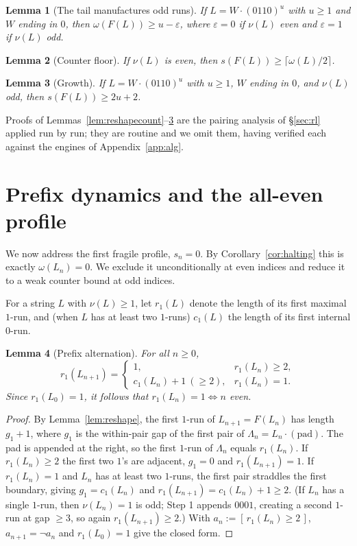 \documentclass[11pt,reqno]{amsart}
\theoremstyle{plain}
\newtheorem{lemma}{Lemma}
\theoremstyle{definition}
\theoremstyle{remark}
\begin{document}
\begin{lemma}[The tail manufactures odd runs]\label{lem:tailodd}
If $L=W\cdot(0110)^u$ with $u\ge 1$ and $W$ ending in $0$, then $\omega(F(L))\ge u-\varepsilon$, where $\varepsilon=0$ if $\nu(L)$ even and $\varepsilon=1$ if $\nu(L)$ odd.
\end{lemma}

\begin{lemma}[Counter floor]\label{lem:cfloor}
If $\nu(L)$ is even, then $s(F(L))\ge\lceil\omega(L)/2\rceil$.
\end{lemma}

\begin{lemma}[Growth]\label{lem:growth}
If $L=W\cdot(0110)^u$ with $u\ge 1$, $W$ ending in $0$, and $\nu(L)$ odd, then $s(F(L))\ge 2u+2$.
\end{lemma}

Proofs of Lemmas~\ref{lem:reshapecount}--\ref{lem:growth} are the pairing analysis of \S\ref{sec:rl} applied run by run; they are routine and we omit them, having verified each against the engines of Appendix~\ref{app:alg}.

\section{Prefix dynamics and the all-even profile}\label{sec:prefix}
We now address the first fragile profile, $s_n=0$. By Corollary~\ref{cor:halting} this is exactly $\omega(L_n)=0$. We exclude it unconditionally at even indices and reduce it to a weak counter bound at odd indices.

For a string $L$ with $\nu(L)\ge 1$, let $r_1(L)$ denote the length of its first maximal $1$-run, and (when $L$ has at least two $1$-runs) $c_1(L)$ the length of its first internal $0$-run.

\begin{lemma}[Prefix alternation]\label{lem:prefix}
For all $n\ge 0$,
\[ r_1(L_{n+1})=\begin{cases}1,& r_1(L_n)\ge 2,\\ c_1(L_n)+1\ (\ge 2),& r_1(L_n)=1.\end{cases} \]
Since $r_1(L_0)=1$, it follows that $r_1(L_n)=1\iff n$ even.
\end{lemma}
\begin{proof}
By Lemma~\ref{lem:reshape}, the first $1$-run of $L_{n+1}=F(L_n)$ has length $g_1+1$, where $g_1$ is the within-pair gap of the first pair of $\Lambda_n=L_n\cdot(\mathrm{pad})$. The pad is appended at the right, so the first $1$-run of $\Lambda_n$ equals $r_1(L_n)$. If $r_1(L_n)\ge 2$ the first two $1$'s are adjacent, $g_1=0$ and $r_1(L_{n+1})=1$. If $r_1(L_n)=1$ and $L_n$ has at least two $1$-runs, the first pair straddles the first boundary, giving $g_1=c_1(L_n)$ and $r_1(L_{n+1})=c_1(L_n)+1\ge 2$. (If $L_n$ has a single $1$-run, then $\nu(L_n)=1$ is odd; Step 1 appends $0001$, creating a second $1$-run at gap $\ge 3$, so again $r_1(L_{n+1})\ge 2$.) With $a_n:=[\,r_1(L_n)\ge 2\,]$, $a_{n+1}=\lnot a_n$ and $r_1(L_0)=1$ give the closed form.
\end{proof}
\end{document}
